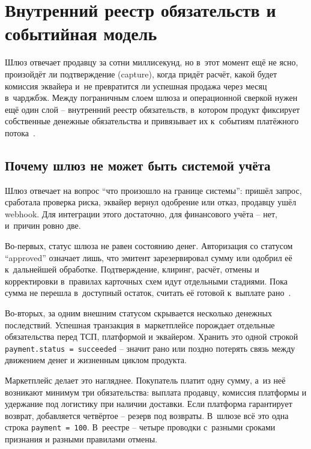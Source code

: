 
\chapter{Внутренний реестр обязательств и событийная модель}\label{ch:internal-ledger}

Шлюз отвечает продавцу за сотни миллисекунд, но в~этот момент
ещё не ясно, произойдёт ли подтверждение (capture), когда придёт
расчёт, какой будет комиссия эквайера и~не превратится ли успешная
продажа через месяц в~чарджбэк. Между пограничным слоем шлюза
и операционной сверкой нужен ещё один слой -- внутренний реестр
обязательств, в~котором продукт фиксирует собственные денежные
обязательства и привязывает их к~событиям платёжного
потока~\cite{visa-core-rules,mc-tpr,stripe-manual-capture}.

\section{Почему шлюз не может быть системой учёта}\label{sec:ledger-why}

Шлюз отвечает на вопрос \enquote{что произошло на границе системы}:
пришёл запрос, сработала проверка риска, эквайер вернул одобрение
или отказ, продавцу ушёл webhook. Для интеграции этого достаточно,
для финансового учёта -- нет, и~причин ровно две.

Во-первых, статус шлюза не равен состоянию денег. Авторизация
со статусом \enquote{approved} означает лишь, что эмитент зарезервировал
сумму или одобрил её к~дальнейшей обработке. Подтверждение, клиринг,
расчёт, отмены и корректировки в~правилах карточных схем идут
отдельными стадиями. Пока сумма не перешла в~доступный остаток,
считать её готовой к~выплате
рано~\cite{visa-core-rules,mc-tpr,stripe-manual-capture,stripe-balances}.

Во-вторых, за одним внешним статусом скрывается несколько денежных
последствий. Успешная транзакция в~маркетплейсе порождает отдельные
обязательства перед ТСП, платформой и эквайером. Хранить это одной
строкой \texttt{payment.status = succeeded} -- значит рано или поздно
потерять связь между движением денег и жизненным циклом продукта.

Маркетплейс делает это нагляднее. Покупатель платит одну сумму,
а~из неё возникают минимум три обязательства: выплата продавцу,
комиссия платформы и удержание под логистику при наличии доставки.
Если платформа гарантирует возврат, добавляется четвёртое --
резерв под возвраты. В~шлюзе всё это одна строка
\texttt{payment = 100}. В~реестре -- четыре проводки с~разными
сроками признания и разными правилами отмены.

